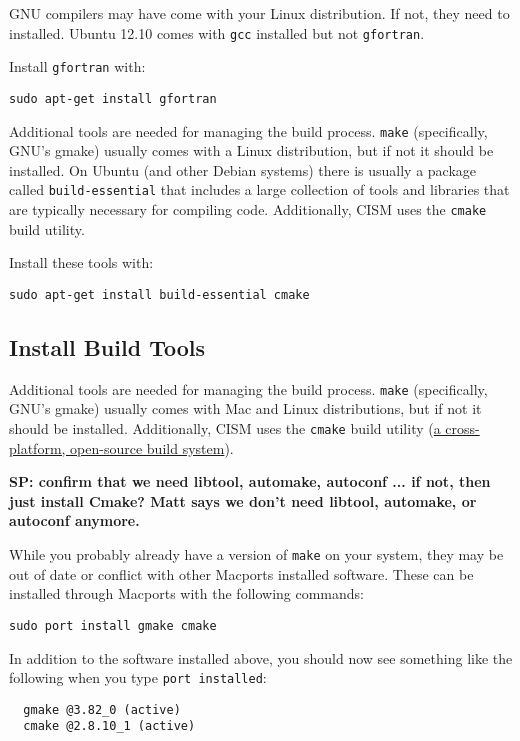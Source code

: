 \begin{mdframed}[style=ubuntu] %
GNU compilers may have come with your Linux distribution.  If not, they need to 
installed.  Ubuntu 12.10 comes with \texttt{gcc} installed but not \texttt{gfortran}.

Install \texttt{gfortran} with:

\texttt{sudo apt-get install gfortran}

Additional tools are needed for managing the build process.  \texttt{make} (specifically, GNU's gmake)
usually comes with a Linux distribution, but if not it should be installed.  On Ubuntu
(and other Debian systems) there is usually a package called \texttt{build-essential} that
includes a large collection of tools and libraries that are typically necessary
for compiling code.  Additionally, CISM uses the \texttt{cmake} build utility.

Install these tools with:

\texttt{sudo apt-get install build-essential cmake}

\end{mdframed}                 %


\subsection{Install Build Tools}

Additional tools are needed for managing the build process.  \texttt{make} (specifically, GNU's gmake)
usually comes with Mac and Linux distributions, but if not it should be installed.  
Additionally, CISM uses the \texttt{cmake} build utility 
(\href{http://www.cmake.org/}{a cross-platform, open-source build system}).

\begin{mdframed}[style=mac] %
\textbf{SP: confirm that we need libtool, automake, autoconf ... if not, then just install Cmake? Matt says we don't need libtool, automake, or autoconf anymore.}

While you probably already have a version of \texttt{make} on your system, they may be out of date or conflict with other Macports installed software. These can be installed through Macports with the following commands: 

\begin{verbatim}
sudo port install gmake cmake
\end{verbatim}

In addition to the software installed above, you should now see something like the following when you type \texttt{port installed}:

\begin{verbatim}
  gmake @3.82_0 (active)
  cmake @2.8.10_1 (active)
\end{verbatim}
\end{mdframed}              %



